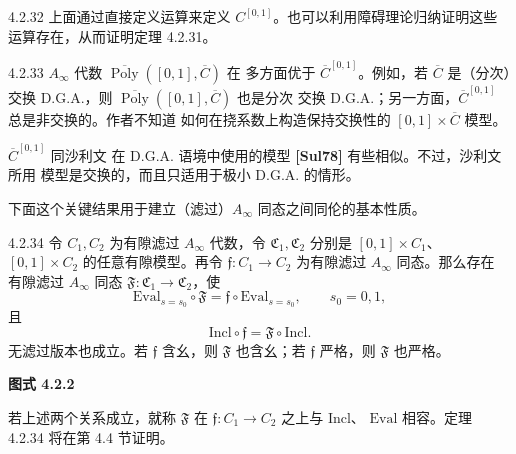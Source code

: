 \begin{remark}{4.2.32}\label{rem:4-2-32}
上面通过直接定义运算来定义 $C^{[0,1]}$。也可以利用障碍理论归纳证明这些
运算存在，从而证明定理 4.2.31。
\end{remark}

\begin{remark}{4.2.33}\label{rem:4-2-33}
$A_\infty$ 代数 $\overline{\operatorname{Poly}}([0,1],\overline C)$ 在
多方面优于 $\overline C^{[0,1]}$。例如，若 $\overline C$ 是（分次）交换
D.G.A.，则 $\overline{\operatorname{Poly}}([0,1],\overline C)$ 也是分次
交换 D.G.A.；另一方面，$\overline C^{[0,1]}$ 总是非交换的。作者不知道
如何在挠系数上构造保持交换性的 $[0,1]\times\overline C$ 模型。

$\overline C^{[0,1]}$ 同沙利文
在 D.G.A. 语境中使用的模型 \textbf{[Sul78]} 有些相似。不过，沙利文所用
模型是交换的，而且只适用于极小 D.G.A. 的情形。
\end{remark}

下面这个关键结果用于建立（滤过）$A_\infty$ 同态之间同伦的基本性质。

\begin{theorem}{4.2.34}\label{thm:4-2-34}
令 $C_1,C_2$ 为有隙滤过 $A_\infty$ 代数，令
$\mathfrak C_1,\mathfrak C_2$ 分别是 $[0,1]\times C_1$、
$[0,1]\times C_2$ 的任意有隙模型。再令
$\mathfrak f\colon C_1\to C_2$ 为有隙滤过 $A_\infty$ 同态。那么存在
有隙滤过 $A_\infty$ 同态
$\mathfrak F\colon\mathfrak C_1\to\mathfrak C_2$，使
\[
 \mathrm{Eval}_{s=s_0}\circ\mathfrak F
 =\mathfrak f\circ\mathrm{Eval}_{s=s_0},
 \qquad s_0=0,1,
\]
且
\[
 \mathrm{Incl}\circ\mathfrak f=\mathfrak F\circ\mathrm{Incl}.
\]
无滤过版本也成立。若 $\mathfrak f$ 含幺，则 $\mathfrak F$ 也含幺；若
$\mathfrak f$ 严格，则 $\mathfrak F$ 也严格。
\end{theorem}

\begin{center}
\par\smallskip\textbf{图式 4.2.2}\label{diag:4-2-2}
\end{center}

若上述两个关系成立，就称 $\mathfrak F$ 在
$\mathfrak f\colon C_1\to C_2$ 之上与 $\mathrm{Incl}$、
$\mathrm{Eval}$ 相容。定理 4.2.34 将在第 4.4 节证明。
